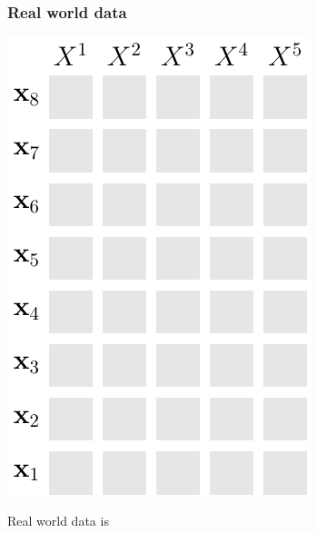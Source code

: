 \documentclass[xcolor={usenames,dvipsnames,svgnames}, compress, aspectratio=169, 11pt]{beamer}
\begin{document}
\begin{frame}[t, htt=bgrey2]
  \frametitle{Real world data}

  \large
  \begin{minipage}[t]{0.6\linewidth}
    \includegraphics[width=.4\linewidth]{figures/abda-grid-empty}
  \end{minipage}\hfill\begin{minipage}[t]{0.3\linewidth}
    \vspace{0pt}
    Real world data is\par
  \end{minipage}  
\end{frame}
\end{document}
